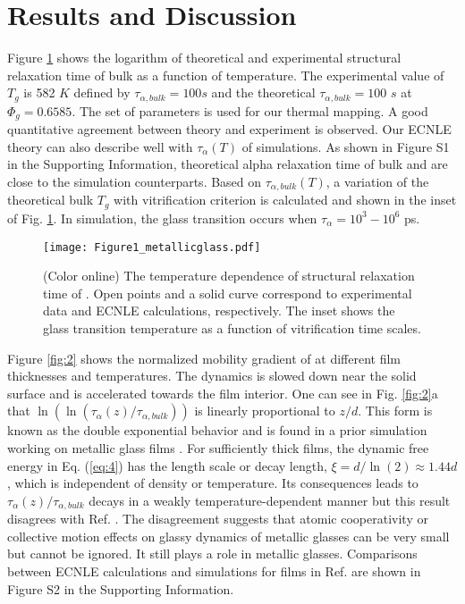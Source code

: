 \documentclass[twocolumn,preprintnumbers,amsmath,amssymb,superscriptaddress]{revtex4}
\begin{document}
\section{Results and Discussion}
Figure \ref{fig:1} shows the logarithm of theoretical and experimental structural relaxation time of bulk  as a function of temperature. The experimental value of $T_g$ is 582 $K$ defined by $\tau_{\alpha,bulk}=100$$s$ and the theoretical $\tau_{\alpha,bulk}=100$ $s$ at $\Phi_g = 0.6585$. The set of parameters is used for our thermal mapping. A good quantitative agreement between theory and experiment is observed. Our ECNLE theory can also describe well with $\tau_\alpha(T)$ of simulations. As shown in Figure S1 in the Supporting Information, theoretical alpha relaxation time of bulk  and  are close to the simulation counterparts. Based on $\tau_{\alpha,bulk}(T)$, a variation of the theoretical bulk $T_g$ with vitrification criterion is calculated and shown in the inset of Fig. \ref{fig:1}. In simulation, the glass transition occurs when $\tau_\alpha= 10^3-10^6$ ps. %

\begin{figure}[htp]
\texttt{[image: Figure1\_metallicglass.pdf]}
\caption{(Color online) The temperature dependence of structural relaxation time of . Open points and a solid curve correspond to experimental data \cite{19} and ECNLE calculations, respectively. The inset shows the glass transition temperature as a function of vitrification time scales.}
\label{fig:1}
\end{figure}

Figure \ref{fig:2} shows the normalized mobility gradient of  at different film thicknesses and temperatures. The dynamics is slowed down near the solid surface and is accelerated towards the film interior. One can see in Fig. \ref{fig:2}a that $\ln(\ln(\tau_\alpha(z)/\tau_{\alpha,bulk}))$ is linearly proportional to $z/d$. This form is known as the double exponential behavior and is found in a prior simulation working on metallic glass films \cite{14}. For sufficiently thick films, the dynamic free energy in Eq. (\ref{eq:4}) has the length scale or decay length, $\xi=d/\ln(2)\approx 1.44d$, which is independent of density or temperature. Its consequences leads to $\tau_\alpha(z)/\tau_{\alpha,bulk}$ decays in a weakly temperature-dependent manner but this result disagrees with Ref. \cite{14}. The disagreement suggests that atomic cooperativity or collective motion effects on glassy dynamics of metallic glasses can be very small but cannot be ignored. It still plays a role in metallic glasses. Comparisons between ECNLE calculations and simulations for  films in Ref. \cite{14} are shown in Figure S2 in the Supporting Information.
\end{document}
